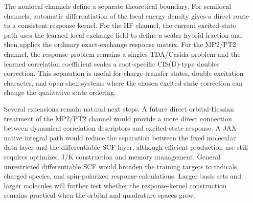 The nonlocal channels define a separate theoretical boundary. For
semilocal channels, automatic differentiation of the local energy
density gives a direct route to a consistent response kernel. For the
HF channel, the current excited-state path uses the learned local
exchange field to define a scalar hybrid fraction and then applies the
ordinary exact-exchange response matrix. For the MP2/PT2 channel, the
response problem remains a singles TDA/Casida problem and the learned
correlation coefficient scales a root-specific CIS(D)-type doubles
correction. This separation is useful for charge-transfer states,
double-excitation character, and open-shell systems where the chosen
excited-state correction can change the qualitative state ordering.

Several extensions remain natural next steps. A future direct
orbital-Hessian treatment of the MP2/PT2 channel would provide a more
direct connection between dynamical correlation descriptors and
excited-state response. A
JAX-native integral path would reduce the separation between the fixed
molecular data layer and the differentiable SCF layer, although
efficient production use still requires optimized J/K construction
and memory management. General unrestricted differentiable SCF would
broaden the training targets to radicals, charged species, and
spin-polarized response calculations. Larger basis sets
and larger molecules will further test whether the response-kernel
construction remains practical when the orbital and quadrature spaces
grow.
